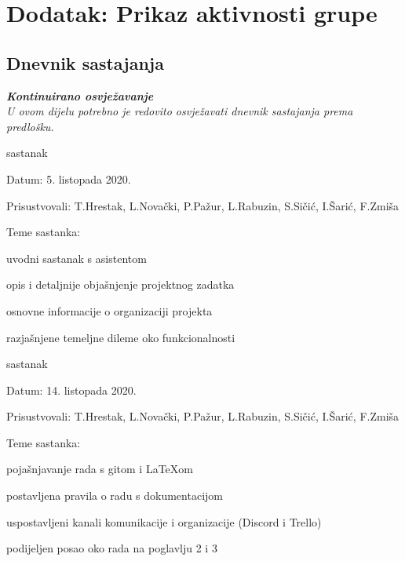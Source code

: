 \chapter*{Dodatak: Prikaz aktivnosti grupe}
		
		\section*{Dnevnik sastajanja}
		
		\textbf{\textit{Kontinuirano osvježavanje}}\\
		
		 \textit{U ovom dijelu potrebno je redovito osvježavati dnevnik sastajanja prema predlošku.}
		
		\begin{packed_enum}
			\item  sastanak
			
			\item[] \begin{packed_item}
				\item Datum: 5. listopada 2020.
				\item Prisustvovali: T.Hrestak, L.Novački, P.Pažur, L.Rabuzin, S.Sičić, I.Šarić, F.Zmiša
				\item Teme sastanka:
				\begin{packed_item}
					\item  uvodni sastanak s asistentom
					\item  opis i detaljnije objašnjenje projektnog zadatka
					\item  osnovne informacije o organizaciji projekta
					\item  razjašnjene temeljne dileme oko funkcionalnosti
				\end{packed_item}
			\end{packed_item}
		
			\item  sastanak
			
			\item[] \begin{packed_item}
				\item Datum: 14. listopada 2020.
				\item Prisustvovali: T.Hrestak, L.Novački, P.Pažur, L.Rabuzin, S.Sičić, I.Šarić, F.Zmiša
				\item Teme sastanka:
				\begin{packed_item}
					\item  pojašnjavanje rada s gitom i \LaTeX om
					\item  postavljena pravila o radu s dokumentacijom
					\item  uspostavljeni kanali komunikacije i organizacije (Discord i Trello)
					\item  podijeljen posao oko rada na poglavlju 2 i 3
				\end{packed_item}
			\end{packed_item}
		

\end{packed_enum}
